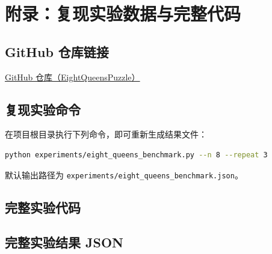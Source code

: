﻿\chapter{附录：复现实验数据与完整代码}\label{chap:appendix-data}

\section{GitHub 仓库链接}

\href{https://github.com/julian-wu-cs/TJ-AI-Course-Design/tree/main/Homework/Experiments/Homework01/EightQueensPuzzle}{GitHub 仓库（EightQueensPuzzle）}

\section{复现实验命令}

在项目根目录执行下列命令，即可重新生成结果文件：

\begin{lstlisting}[language=bash,caption={八皇后实验复现命令},label=lst:reproduce]
python experiments/eight_queens_benchmark.py --n 8 --repeat 3
\end{lstlisting}

默认输出路径为 \texttt{experiments/eight\_queens\_benchmark.json}。

\section{完整实验代码}



\section{完整实验结果 JSON}


